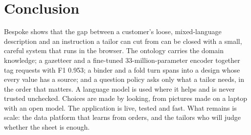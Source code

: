 \section{Conclusion}
Bespoke shows that the gap between a customer's loose, mixed-language description and an instruction a tailor can cut from can be closed with a small, careful system that runs in the browser. The ontology carries the domain knowledge; a gazetteer and a fine-tuned 33-million-parameter encoder together tag requests with F1 0.953; a binder and a fold turn spans into a design whose every value has a source; and a question policy asks only what a tailor needs, in the order that matters. A language model is used where it helps and is never trusted unchecked. Choices are made by looking, from pictures made on a laptop with an open model. The application is live, tested and fast. What remains is scale: the data platform that learns from orders, and the tailors who will judge whether the sheet is enough.
